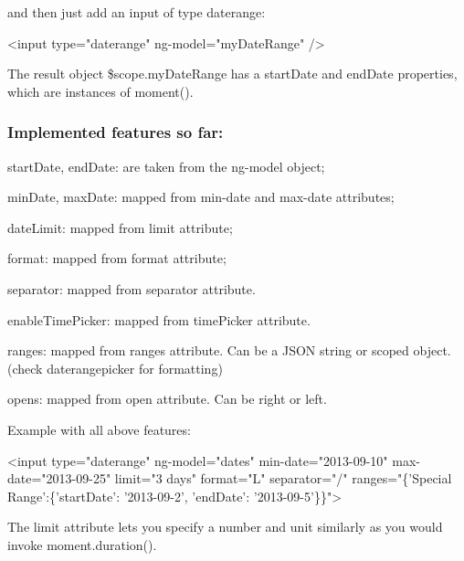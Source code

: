 and then just add an {\ttfamily input} of type {\ttfamily daterange}\+:


\begin{DoxyCode}
<input type="daterange" ng-model="myDateRange" />
\end{DoxyCode}


The result object {\ttfamily \$scope.\+my\+Date\+Range} has a {\ttfamily start\+Date} and {\ttfamily end\+Date} properties, which are instances of {\ttfamily moment()}.

\subsubsection*{Implemented features so far\+:}


\begin{DoxyItemize}
\item {\ttfamily start\+Date}, {\ttfamily end\+Date}\+: are taken from the {\ttfamily ng-\/model} object;
\item {\ttfamily min\+Date}, {\ttfamily max\+Date}\+: mapped from {\ttfamily min-\/date} and {\ttfamily max-\/date} attributes;
\item {\ttfamily date\+Limit}\+: mapped from {\ttfamily limit} attribute;
\item {\ttfamily format}\+: mapped from {\ttfamily format} attribute;
\item {\ttfamily separator}\+: mapped from {\ttfamily separator} attribute.
\item {\ttfamily enable\+Time\+Picker}\+: mapped from {\ttfamily time\+Picker} attribute.
\item {\ttfamily ranges}\+: mapped from {\ttfamily ranges} attribute. Can be a J\+S\+ON string or scoped object. (check daterangepicker for formatting)
\item {\ttfamily opens}\+: mapped from {\ttfamily open} attribute. Can be {\ttfamily right} or {\ttfamily left}.
\end{DoxyItemize}

Example with all above features\+:


\begin{DoxyCode}
<input
    type="daterange"
    ng-model="dates"
    min-date="2013-09-10"
    max-date="2013-09-25"
    limit="3 days"
    format="L"
    separator="/"
    ranges="\{'Special Range':\{'startDate': '2013-09-2', 'endDate': '2013-09-5'\}\}">
\end{DoxyCode}


The {\ttfamily limit} attribute lets you specify a number and unit similarly as you would invoke {\ttfamily moment.\+duration()}.

